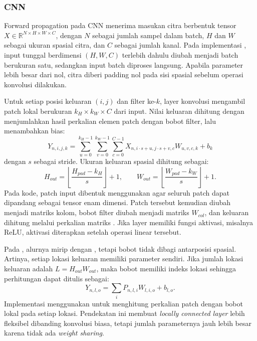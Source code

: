 \subsubsection{CNN}
Forward propagation pada CNN menerima masukan citra berbentuk tensor
$X \in \mathbb{R}^{N \times H \times W \times C}$, dengan $N$ sebagai
jumlah sampel dalam batch, $H$ dan $W$ sebagai ukuran spasial citra, dan
$C$ sebagai jumlah kanal. Pada implementasi , input tunggal
berdimensi $(H, W, C)$ terlebih dahulu diubah menjadi batch berukuran satu,
sedangkan input batch diproses langsung. Apabila parameter  lebih
besar dari nol, citra diberi padding nol pada sisi spasial sebelum operasi
konvolusi dilakukan.

Untuk setiap posisi keluaran $(i,j)$ dan filter ke-$k$, layer konvolusi
mengambil patch lokal berukuran $k_H \times k_W \times C$ dari input.
Nilai keluaran dihitung dengan menjumlahkan hasil perkalian elemen patch
dengan bobot filter, lalu menambahkan bias:
\[
Y_{n,i,j,k} =
\sum_{u=0}^{k_H-1}
\sum_{v=0}^{k_W-1}
\sum_{c=0}^{C-1}
X_{n, i \cdot s + u, j \cdot s + v, c}
W_{u,v,c,k} + b_k
\]
dengan $s$ sebagai stride. Ukuran keluaran spasial dihitung sebagai:
\[
H_{out} = \left\lfloor \frac{H_{pad} - k_H}{s} \right\rfloor + 1,
\qquad
W_{out} = \left\lfloor \frac{W_{pad} - k_W}{s} \right\rfloor + 1.
\]
Pada kode, patch input dibentuk menggunakan 
agar seluruh patch dapat dipandang sebagai tensor enam dimensi. Patch tersebut
kemudian diubah menjadi matriks kolom, bobot filter diubah menjadi matriks
$W_{col}$, dan keluaran dihitung melalui perkalian matriks .
Jika layer memiliki fungsi aktivasi, misalnya ReLU, aktivasi diterapkan setelah
operasi linear tersebut.

Pada , alurnya mirip dengan , tetapi bobot
tidak dibagi antarposisi spasial. Artinya, setiap lokasi keluaran memiliki
parameter sendiri. Jika jumlah lokasi keluaran adalah $L = H_{out}W_{out}$,
maka bobot memiliki indeks lokasi sehingga perhitungan dapat ditulis sebagai:
\[
Y_{n,l,o} = \sum_i P_{n,l,i} W_{l,i,o} + b_{l,o}.
\]
Implementasi menggunakan  untuk menghitung perkalian patch
dengan bobot lokal pada setiap lokasi. Pendekatan ini membuat
\textit{locally connected layer} lebih fleksibel dibanding konvolusi biasa,
tetapi jumlah parameternya jauh lebih besar karena tidak ada \textit{weight sharing}.

